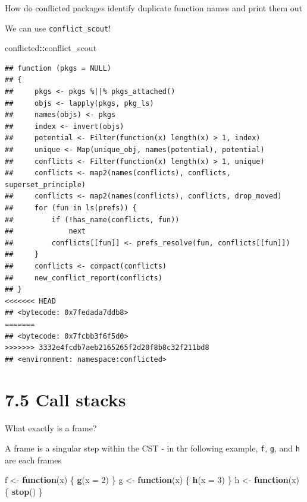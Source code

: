 \documentclass[]{book}
\newenvironment{Shaded}{\begin{snugshade}}{\end{snugshade}}
\newcommand{\ControlFlowTok}[1]{\textcolor[rgb]{0.13,0.29,0.53}{\textbf{#1}}}
\newcommand{\DataTypeTok}[1]{\textcolor[rgb]{0.13,0.29,0.53}{#1}}
\newcommand{\DecValTok}[1]{\textcolor[rgb]{0.00,0.00,0.81}{#1}}
\newcommand{\KeywordTok}[1]{\textcolor[rgb]{0.13,0.29,0.53}{\textbf{#1}}}
\newcommand{\NormalTok}[1]{#1}
\newcommand{\OperatorTok}[1]{\textcolor[rgb]{0.81,0.36,0.00}{\textbf{#1}}}
\newcommand{\StringTok}[1]{\textcolor[rgb]{0.31,0.60,0.02}{#1}}
\begin{document}
How do conflicted packages identify duplicate function names and print them out

We can use \texttt{conflict\_scout}!

\begin{Shaded}
\begin{Highlighting}[]
\NormalTok{conflicted}\OperatorTok{::}\NormalTok{conflict_scout}
\end{Highlighting}
\end{Shaded}

\begin{verbatim}
## function (pkgs = NULL) 
## {
##     pkgs <- pkgs %||% pkgs_attached()
##     objs <- lapply(pkgs, pkg_ls)
##     names(objs) <- pkgs
##     index <- invert(objs)
##     potential <- Filter(function(x) length(x) > 1, index)
##     unique <- Map(unique_obj, names(potential), potential)
##     conflicts <- Filter(function(x) length(x) > 1, unique)
##     conflicts <- map2(names(conflicts), conflicts, superset_principle)
##     conflicts <- map2(names(conflicts), conflicts, drop_moved)
##     for (fun in ls(prefs)) {
##         if (!has_name(conflicts, fun)) 
##             next
##         conflicts[[fun]] <- prefs_resolve(fun, conflicts[[fun]])
##     }
##     conflicts <- compact(conflicts)
##     new_conflict_report(conflicts)
## }
<<<<<<< HEAD
## <bytecode: 0x7fedada7ddb8>
=======
## <bytecode: 0x7fcbb3f6f5d0>
>>>>>>> 3332e4fcdb7aeb2165265f2d20f8b8c32f211bd8
## <environment: namespace:conflicted>
\end{verbatim}

\hypertarget{call-stacks}{%
\section*{7.5 Call stacks}\label{call-stacks}}

What exactly is a frame?

A frame is a singular step within the CST - in thr following example, \texttt{f}, \texttt{g}, and \texttt{h} are each frames

\begin{Shaded}
\begin{Highlighting}[]
\NormalTok{f <-}\StringTok{ }\ControlFlowTok{function}\NormalTok{(x) \{}
  \KeywordTok{g}\NormalTok{(}\DataTypeTok{x =} \DecValTok{2}\NormalTok{)}
\NormalTok{\}}
\NormalTok{g <-}\StringTok{ }\ControlFlowTok{function}\NormalTok{(x) \{}
  \KeywordTok{h}\NormalTok{(}\DataTypeTok{x =} \DecValTok{3}\NormalTok{)}
\NormalTok{\}}
\NormalTok{h <-}\StringTok{ }\ControlFlowTok{function}\NormalTok{(x) \{}
  \KeywordTok{stop}\NormalTok{()}
\NormalTok{\}}
\end{Highlighting}
\end{Shaded}
\end{document}
